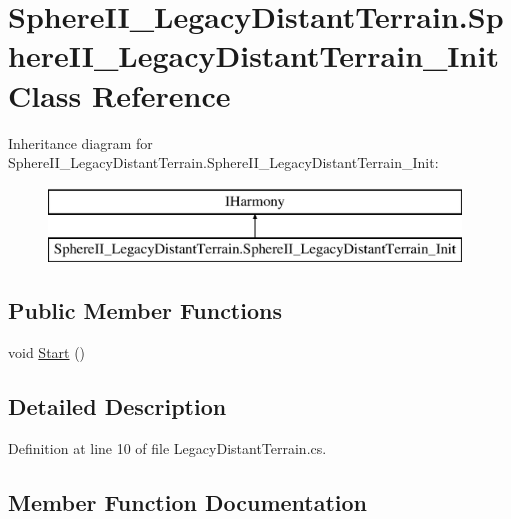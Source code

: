 \hypertarget{class_sphere_i_i___legacy_distant_terrain_1_1_sphere_i_i___legacy_distant_terrain___init}{}\section{Sphere\+I\+I\+\_\+\+Legacy\+Distant\+Terrain.\+Sphere\+I\+I\+\_\+\+Legacy\+Distant\+Terrain\+\_\+\+Init Class Reference}
\label{class_sphere_i_i___legacy_distant_terrain_1_1_sphere_i_i___legacy_distant_terrain___init}
Inheritance diagram for Sphere\+I\+I\+\_\+\+Legacy\+Distant\+Terrain.\+Sphere\+I\+I\+\_\+\+Legacy\+Distant\+Terrain\+\_\+\+Init\+:\begin{figure}[H]
\begin{center}
\leavevmode
\includegraphics[height=2.000000cm]{class_sphere_i_i___legacy_distant_terrain_1_1_sphere_i_i___legacy_distant_terrain___init}
\end{center}
\end{figure}
\subsection*{Public Member Functions}
\begin{DoxyCompactItemize}
\item 
void \mbox{\hyperlink{class_sphere_i_i___legacy_distant_terrain_1_1_sphere_i_i___legacy_distant_terrain___init_af49de2ff7efbeb4d5a2ad415fea193c7}{Start}} ()
\end{DoxyCompactItemize}


\subsection{Detailed Description}


Definition at line 10 of file Legacy\+Distant\+Terrain.\+cs.



\subsection{Member Function Documentation}
\mbox{\label{class_sphere_i_i___legacy_distant_terrain_1_1_sphere_i_i___legacy_distant_terrain___init_af49de2ff7efbeb4d5a2ad415fea193c7}} 
